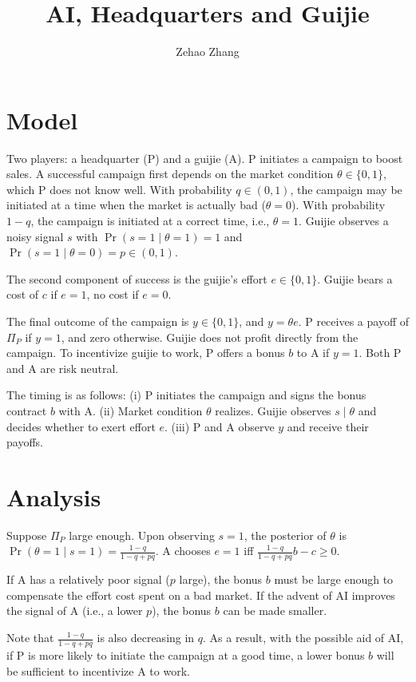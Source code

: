 \documentclass[11pt]{article}
\title{AI, Headquarters and Guijie}
\author{Zehao Zhang}
\begin{document}
\maketitle

\section{Model}

Two players: a headquarter (P) and a guijie (A). P initiates a campaign to boost sales. A successful campaign first depends on the market condition $\theta \in \{0, 1\}$, which P does not know well. With probability $q \in (0, 1)$, the campaign may be initiated at a time when the market is actually bad ($\theta = 0$). With probability $1-q$, the campaign is initiated at a correct time, i.e., $\theta = 1$. Guijie observes a noisy signal $s$ with $\Pr(s=1\mid \theta=1)=1$ and $\Pr(s=1\mid \theta=0)=p\in(0,1)$.

The second component of success is the guijie's effort $e \in \{0, 1\}$. Guijie bears a cost of $c$ if $e = 1$, no cost if $e = 0$.

The final outcome of the campaign is $y \in \{0, 1\}$, and $y = \theta e$. P receives a payoff of $\Pi_P$ if $y = 1$, and zero otherwise. Guijie does not profit directly from the campaign. To incentivize guijie to work, P offers a bonus $b$ to A if $y = 1$. Both P and A are risk neutral.

The timing is as follows: (i) P initiates the campaign and signs the bonus contract $b$ with A. (ii) Market condition $\theta$ realizes. Guijie observes $s\mid \theta$ and decides whether to exert effort $e$. (iii) P and A observe $y$ and receive their payoffs.

\section{Analysis}
Suppose $\Pi_P$ large enough. Upon observing $s=1$, the posterior of $\theta$ is $\Pr(\theta=1\mid s=1)=\frac{1-q}{1-q+pq}$. A chooses $e = 1$ iff $\frac{1-q}{1-q+pq} b - c \geq 0$. 

If A has a relatively poor signal ($p$ large), the bonus $b$ must be large enough to compensate the effort cost spent on a bad market. If the advent of AI improves the signal of A (i.e., a lower $p$), the bonus $b$ can be made smaller.

Note that $\frac{1-q}{1-q+pq}$ is also decreasing in $q$.  As a result, with the possible aid of AI, if P is more likely to initiate the campaign at a good time, a lower bonus $b$ will be sufficient to incentivize A to work.
\end{document}
